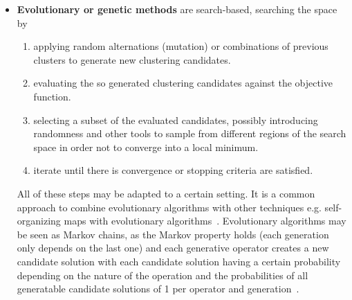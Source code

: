 \begin{itemize}
    \item \textbf{Evolutionary or genetic methods} are search-based, searching the space by 
        \begin{enumerate}
            \item applying random alternations (mutation) or combinations of previous clusters to generate new clustering candidates.
            \item evaluating the so generated clustering candidates against the objective function.
            \item selecting a subset of the evaluated candidates, possibly introducing randomness and other tools to sample from different regions of the search space in order not to converge into a local minimum.
            \item iterate until there is convergence or stopping criteria are satisfied.
        \end{enumerate}
        All of these steps may be adapted to a certain setting. It is a common approach to combine evolutionary algorithms with other techniques e.g. self-organizing maps with evolutionary algorithms~\cite{leng2006design}. Evolutionary algorithms may be seen as Markov chains, as the Markov property holds (each generation only depends on the last one) and each generative operator creates a new candidate solution with each candidate solution having a certain probability depending on the nature of the operation and the probabilities of all generatable candidate solutions of 1 per operator and generation~\cite{Nix1992}.
\end{itemize}



